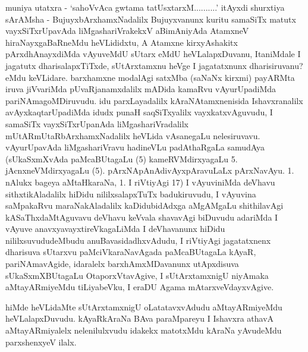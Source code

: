 \begin{artha}
muniya utatxra - `sahoVvAca gwtama tatUsxtarxM..........' itAyxdi shurxtiya sArAMsha - BujuyxbArxhamxNadalilx Bujuyxvanunx kuritu samaSiTx matutx vayxSiTxrUpavAda liMgashariVrakekxV aBimAniyAda AtamxneV hiraNayxgaBaRneMdu heVLididxtu, A Atamxne kirxyAshakitx pArxdhAnayxdiMda vAyuveMdU sUtarx eMdU heVLalapxDuvanu, ItaniMdale I jagatutx dharisalapxTiTxde, sUtArxtamxnu heVge I jagatatxnunx dharisiruvanu? eMdu keVLidare. barxhamxne modalAgi satxMba (saNaNx kirxmi) payARMta iruva jiVvariMda pUvaRjanamxdalilx mADida kamaRvu vAyurUpadiMda pariNAmagoMDiruvudu. idu parxLayadalilx kAraNAtamxnenisida Ishavxranalilx avAyxkaqtarUpadiMda idudx punaH saqSiTxyalilx vayxkatxvAguvudu, I samaSiTx vayxSiTxrUpanAda liMgashariVradalilx mUtARmUtaRbArxhamxNadalilx heVLida vAsanegaLu nelesiruvavu. vAyurUpavAda liMgashariVravu hadineVLu padAthaRgaLa samudAya (sUkaSxmXvAda paMcaBUtagaLu (5) kameRVMdirxyagaLu 5. jAcnxneVMdirxyagaLu (5). pArxNApAnAdivAyxpAravuLaLx pArxNavAyu. 1. nAlukx bageya aMtaHkaraNa, 1. I riVtiyAgi 17) I vAyuviniMda deVhavu sithxtikAladalilx hiDidu nililxsalapxTuTx badukiruvudu, I vAyuvina saMpakaRvu maraNakAladalilx kaDidubidAdxga aMgAMgaLu shithilavAgi kASaThxdaMtAguvavu deVhavu keVvala shavavAgi biDuvudu adariMda I vAyuve anavxyavayxtireVkagaLiMda I deVhavanunx hiDidu nililxsuvududeMbudu anuBavasidadhxvAdudu, I riVtiyAgi jagatatxnenx dharisuva sUtarxvu paMciVkaraNavAgada paMcaBUtagaLa kAyaR, pariNAmavAgide, idaralelx barxhAmxMDavanunx utApxdisuva sUkaSxmXBUtagaLu OtaporxVtavAgive, I sUtArxtamxnigU niyAmaka aMtayARmiyeMdu tiLiyabeVku, I eraDU Agama mAtarxveVdayxvAgive.
\end{artha}


\begin{artha}
hiMde heVLidaMte sUtArxtamxnigU oLatatavxvAdudu aMtayARmiyeMdu heVLalapxDuvudu. kAyaRkAraNa BAva paraMpareyu I Ishavxra athavA aMtayARmiyalelx nelenilulxvudu idakekx matotxMdu kAraNa yAvudeMdu parxshenxyeV ilalx.
\end{artha}

